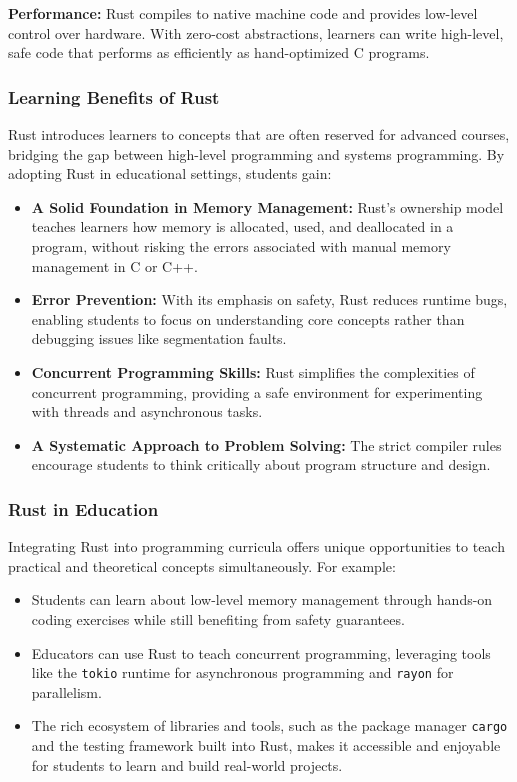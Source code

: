 \documentclass[12pt]{article}
\begin{document}
\textbf{Performance:} Rust compiles to native machine code and provides low-level control over hardware. With zero-cost abstractions, learners can write high-level, safe code that performs as efficiently as hand-optimized C programs.

\subsubsection{Learning Benefits of Rust}
Rust introduces learners to concepts that are often reserved for advanced courses, bridging the gap between high-level programming and systems programming. By adopting Rust in educational settings, students gain:
\begin{itemize}
    \item \textbf{A Solid Foundation in Memory Management:} Rust’s ownership model teaches learners how memory is allocated, used, and deallocated in a program, without risking the errors associated with manual memory management in C or C++.
    \item \textbf{Error Prevention:} With its emphasis on safety, Rust reduces runtime bugs, enabling students to focus on understanding core concepts rather than debugging issues like segmentation faults.
    \item \textbf{Concurrent Programming Skills:} Rust simplifies the complexities of concurrent programming, providing a safe environment for experimenting with threads and asynchronous tasks.
    \item \textbf{A Systematic Approach to Problem Solving:} The strict compiler rules encourage students to think critically about program structure and design.
\end{itemize}

\subsubsection{Rust in Education}
Integrating Rust into programming curricula offers unique opportunities to teach practical and theoretical concepts simultaneously. For example:
\begin{itemize}
    \item Students can learn about low-level memory management through hands-on coding exercises while still benefiting from safety guarantees.
    \item Educators can use Rust to teach concurrent programming, leveraging tools like the \texttt{tokio} runtime for asynchronous programming and \texttt{rayon} for parallelism.
    \item The rich ecosystem of libraries and tools, such as the package manager \texttt{cargo} and the testing framework built into Rust, makes it accessible and enjoyable for students to learn and build real-world projects.
\end{itemize}
\end{document}
